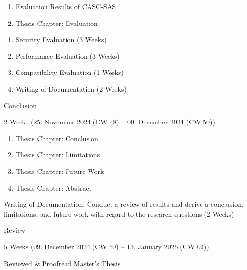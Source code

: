 \begin{description}
\begin{description}[style=multiline, leftmargin=\widthof{\textbf{Deliverables:}}]
        \begin{enumerate}[label=\alph*), leftmargin=\widthof{a)}+\labelsep]
            \item Evaluation Results of CASC-SAS
            \item Thesis Chapter: Evaluation
        \end{enumerate}
        \item[Increments:]
        \begin{enumerate}[label=\arabic*), leftmargin=\widthof{a)}+\labelsep]
            \item Security Evaluation (3 Weeks)
            \item Performance Evaluation (3 Weeks)
            \item Compatibility Evaluation (1 Weeks)
            \item Writing of Documentation (2 Weeks)
        \end{enumerate}
    \end{description}
    \item[Milestone IV:] Conclusion
    \begin{description}[style=multiline, leftmargin=\widthof{\textbf{Deliverables:}}]
        \item[Duration:] 2 Weeks (25. November 2024 (CW 48) -- 09. December 2024 (CW 50))
        \item[Deliverables:]
        \begin{enumerate}[label=\alph*), leftmargin=\widthof{a)}+\labelsep]
            \item Thesis Chapter: Conclusion
            \item Thesis Chapter: Limitations
            \item Thesis Chapter: Future Work
            \item Thesis Chapter: Abstract
        \end{enumerate}
        \item[Increment:] Writing of Documentation: Conduct a review of results and derive a conclusion, limitations, and future work with regard to the research questions (2 Weeks)
    \end{description}
    \item[Milestone V:] Review
    \begin{description}[style=multiline, leftmargin=\widthof{\textbf{Deliverables:}}]
        \item[Duration:] 5 Weeks (09. December 2024 (CW 50) -- 13. January 2025 (CW 03))
        \item[Deliverables:] Reviewed \& Proofread Master's Thesis

\end{description}
\end{description}

